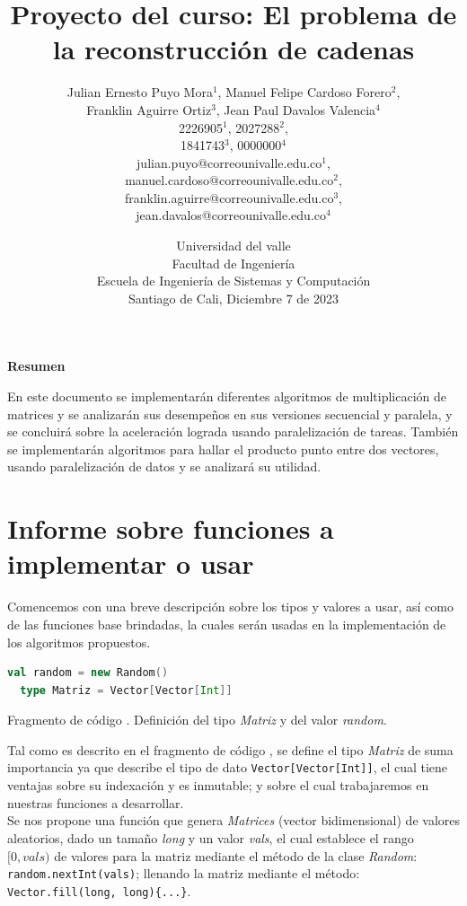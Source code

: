 \documentclass{article}
\title{\textbf{Proyecto del curso: El problema de la reconstrucción de cadenas}}
\author{Julian Ernesto Puyo Mora$^1$,
        Manuel Felipe Cardoso Forero$^2$,\\
        Franklin Aguirre Ortiz$^3$,
        Jean Paul Davalos Valencia$^4$\\        
        2226905$^1$, 2027288$^2$,\\
        1841743$^3$, 0000000$^4$\\
        julian.puyo@correounivalle.edu.co$^1$,\\ 
        manuel.cardoso@correounivalle.edu.co$^2$,\\
        franklin.aguirre@correounivalle.edu.co$^3$,\\
        jean.davalos@correounivalle.edu.co$^4$\\}
\date{Universidad del valle\\ Facultad de Ingeniería\\ Escuela de Ingeniería de Sistemas y Computación\\
Santiago de Cali, Diciembre 7 de 2023}
\newcounter{codesnippet}
\newcommand{\newcodesnippet}{%
  \stepcounter{codesnippet}%
}
\begin{document}
\maketitle

\begin{center}
{\bf \large Resumen}\\
\end{center}

En este documento se implementarán diferentes algoritmos de multiplicación de matrices y se analizarán sus desempeños en sus versiones secuencial y paralela, y se concluirá sobre la aceleración lograda usando paralelización de tareas. También se implementarán
algoritmos para hallar el producto punto entre dos vectores, usando paralelización de
datos y se analizará su utilidad.

\section{Informe sobre funciones a implementar o usar}

Comencemos con una breve descripción sobre los tipos y valores a usar, así como de las funciones base brindadas, la cuales serán usadas en la implementación de los algoritmos propuestos.

\newcodesnippet
\begin{lstlisting}[language=Scala]
  val random = new Random()
  type Matriz = Vector[Vector[Int]]
\end{lstlisting}
\begin{center}
    \small{Fragmento de código \thecodesnippet. Definición del tipo \textit{Matriz} y del valor \textit{random}.}
\end{center}

Tal como es descrito en el fragmento de código \thecodesnippet, se define el tipo \textit{Matriz} de suma importancia ya que describe el tipo de dato \verb|Vector[Vector[Int]]|, el cual tiene ventajas sobre su indexación y es inmutable; y sobre el cual trabajaremos en nuestras funciones a desarrollar. \\

Se nos propone una función que genera \textit{Matrices} (vector bidimensional) de valores aleatorios, dado un tamaño \textit{long} y un valor \textit{vals}, el cual establece el rango \([0,vals)\) de valores para la matriz mediante el método de la clase \textit{Random}: \verb|random.nextInt(vals)|; llenando la matriz mediante el método: \verb|Vector.fill(long, long){...}|.
\end{document}
